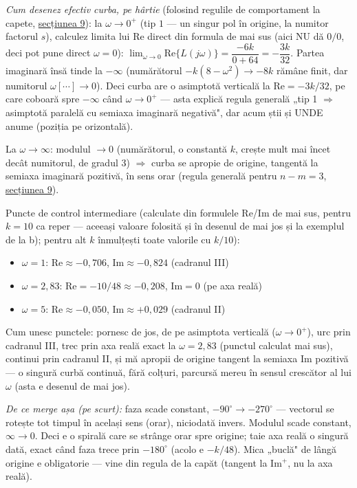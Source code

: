 \documentclass[10pt,a4paper]{article}
\begin{document}
\textit{Cum desenez efectiv curba, pe hârtie} (folosind regulile de comportament la capete, \hyperref[sec:9]{secțiunea 9}): la $\omega\to0^+$ (tip $1$ — un singur pol în origine, la numitor factorul $s$), calculez limita lui $\mathrm{Re}$ direct din formula de mai sus (aici NU dă $0/0$, deci pot pune direct $\omega{=}0$): $\lim_{\omega\to0}\mathrm{Re}\{L(j\omega)\}=\dfrac{-6k}{0+64}=-\dfrac{3k}{32}$. Partea imaginară însă tinde la $-\infty$ (numărătorul $-k(8-\omega^2)\to-8k$ rămâne finit, dar numitorul $\omega[\cdots]\to0$). Deci curba are o asimptotă verticală la $\mathrm{Re}=-3k/32$, pe care coboară spre $-\infty$ când $\omega\to0^+$ — asta explică regula generală „tip 1 $\Rightarrow$ asimptotă paralelă cu semiaxa imaginară negativă", dar acum știi și UNDE anume (poziția pe orizontală).

La $\omega\to\infty$: modulul $\to0$ (numărătorul, o constantă $k$, crește mult mai încet decât numitorul, de gradul 3) $\Rightarrow$ curba se apropie de origine, tangentă la semiaxa imaginară pozitivă, în sens orar (regula generală pentru $n{-}m{=}3$, \hyperref[sec:9]{secțiunea 9}).

Puncte de control intermediare (calculate din formulele Re/Im de mai sus, pentru $k{=}10$ ca reper — aceeași valoare folosită și în desenul de mai jos și la exemplul de la b); pentru alt $k$ înmulțești toate valorile cu $k/10$):
\begin{itemize}
\item $\omega{=}1$: $\mathrm{Re}\approx-0{,}706$, $\mathrm{Im}\approx-0{,}824$ (cadranul III)
\item $\omega{=}2{,}83$: $\mathrm{Re}{=}-10/48\approx-0{,}208$, $\mathrm{Im}{=}0$ (pe axa reală)
\item $\omega{=}5$: $\mathrm{Re}\approx-0{,}050$, $\mathrm{Im}\approx+0{,}029$ (cadranul II)
\end{itemize}
Cum unesc punctele: pornesc de jos, de pe asimptota verticală ($\omega\to0^+$), urc prin cadranul III, trec prin axa reală exact la $\omega{=}2{,}83$ (punctul calculat mai sus), continui prin cadranul II, și mă apropii de origine tangent la semiaxa Im pozitivă — o singură curbă continuă, fără colțuri, parcursă mereu în sensul crescător al lui $\omega$ (asta e desenul de mai jos).

\textit{De ce merge așa (pe scurt):} faza scade constant, $-90^\circ\to-270^\circ$ — vectorul se rotește tot timpul în același sens (orar), niciodată invers. Modulul scade constant, $\infty\to0$. Deci e o spirală care se strânge orar spre origine; taie axa reală o singură dată, exact când faza trece prin $-180^\circ$ (acolo e $-k/48$). Mica „buclă" de lângă origine e obligatorie — vine din regula de la capăt (tangent la Im$^+$, nu la axa reală).
\end{document}
